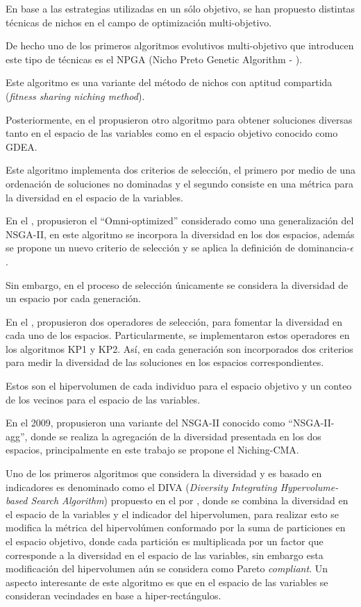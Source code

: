 %
En base a las estrategias utilizadas en un sólo objetivo, se han propuesto distintas técnicas de nichos en el campo de optimización multi-objetivo.

%
De hecho uno de los primeros algoritmos evolutivos multi-objetivo que introducen este tipo de técnicas es el NPGA (Nicho Preto Genetic Algorithm - \cite{Joel:NPGA}).

%
Este algoritmo es una variante del método de nichos con aptitud compartida (\textit{fitness sharing niching method}).

%
Posteriormente, \citeauthor{toffolo2003genetic} en el \citeyear{toffolo2003genetic} propusieron otro algoritmo para obtener soluciones diversas tanto en el espacio de las variables como en el espacio objetivo conocido como GDEA.

%
Este algoritmo implementa dos criterios de selección, el primero por medio de una ordenación de soluciones no dominadas y el segundo consiste en una métrica para la diversidad en el espacio de la variables.

%

En el \citeyear{deb2005omni}, \citeauthor{deb2005omni} propusieron el ``Omni-optimized'' considerado como una generalización del NSGA-II, en este algoritmo se incorpora la diversidad en los dos espacios, además se propone un nuevo criterio de selección y se aplica la definición de dominancia-$\epsilon$.

%
Sin embargo, en el proceso de selección únicamente se considera la diversidad de un espacio por cada generación.


En el \citeyear{chan2005evolutionary}, \citeauthor{chan2005evolutionary} propusieron dos operadores de selección, para fomentar la diversidad en cada uno de los espacios.
%
Particularmente, se implementaron estos operadores en los algoritmos KP1 y KP2.
%
Así, en cada generación son incorporados dos criterios para medir la diversidad de las soluciones en los espacios correspondientes.

%
Estos son el hipervolumen de cada individuo para el espacio objetivo y un conteo de los vecinos para el espacio de las variables.


En el 2009, \citeauthor{shir2009enhancing} propusieron una variante del NSGA-II conocido como ``NSGA-II-agg'', donde se realiza la agregación de la diversidad presentada en los dos espacios, principalmente en este trabajo se propone el Niching-CMA.
%
%

Uno de los primeros algoritmos que considera la diversidad y es basado en indicadores es denominado como el DIVA (\textit{Diversity Integrating Hypervolume-based Search Algorithm}) propuesto en el \citeyear{ulrich2010integrating} por \citeauthor{ulrich2010integrating}, donde se combina la diversidad en el espacio de la variables y el indicador del hipervolumen, para realizar esto se modifica la métrica del hipervolúmen conformado por la suma de particiones en el espacio objetivo, donde cada partición es multiplicada por un factor que corresponde a la diversidad en el espacio de las variables, sin embargo esta modificación del hipervolumen aún se considera como Pareto \textit{compliant}.
%
Un aspecto interesante de este algoritmo es que en el espacio de las variables se consideran vecindades en base a hiper-rectángulos.



